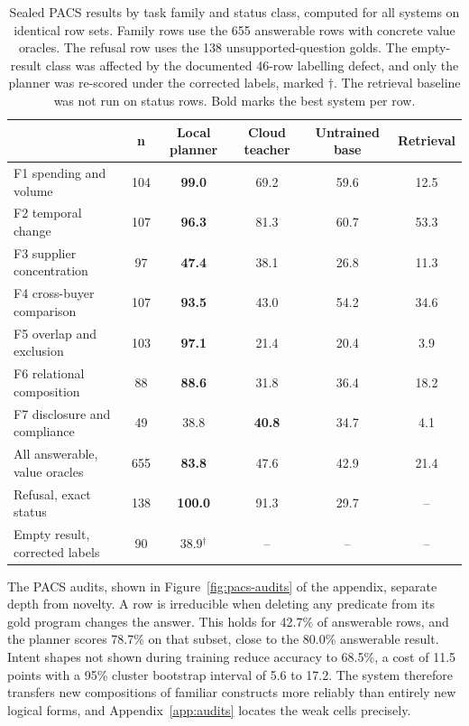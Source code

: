 \documentclass{article}
\begin{document}
\begin{table}[t]
\centering
\caption{Sealed PACS results by task family and status class, computed
for all systems on identical row sets. Family rows use the 655 answerable
rows with concrete value oracles. The refusal row uses the 138
unsupported-question golds. The empty-result class was affected by the
documented 46-row labelling defect, and only the planner was re-scored
under the corrected labels, marked $\dagger$. The retrieval baseline was
not run on status rows. Bold marks the best system per row.}
\label{tab:pacs-family}
\small
\begin{tabular}{lccccc}
\toprule
 & n & Local planner & Cloud teacher & Untrained base & Retrieval \\
\midrule
F1 spending and volume & 104 & \textbf{99.0} & 69.2 & 59.6 & 12.5 \\
F2 temporal change & 107 & \textbf{96.3} & 81.3 & 60.7 & 53.3 \\
F3 supplier concentration & 97 & \textbf{47.4} & 38.1 & 26.8 & 11.3 \\
F4 cross-buyer comparison & 107 & \textbf{93.5} & 43.0 & 54.2 & 34.6 \\
F5 overlap and exclusion & 103 & \textbf{97.1} & 21.4 & 20.4 & 3.9 \\
F6 relational composition & 88 & \textbf{88.6} & 31.8 & 36.4 & 18.2 \\
F7 disclosure and compliance & 49 & 38.8 & \textbf{40.8} & 34.7 & 4.1 \\
\midrule
All answerable, value oracles & 655 & \textbf{83.8} & 47.6 & 42.9 & 21.4 \\
Refusal, exact status & 138 & \textbf{100.0} & 91.3 & 29.7 & -- \\
Empty result, corrected labels & 90 & 38.9$^\dagger$ & -- & -- & -- \\
\bottomrule
\end{tabular}
\end{table}

The PACS audits, shown in Figure~\ref{fig:pacs-audits} of the appendix, separate depth from novelty.
A row is irreducible when deleting any predicate from its gold program changes
the answer. This holds for 42.7\% of answerable rows, and the planner scores
78.7\% on that subset, close to the 80.0\% answerable result. Intent shapes not
shown during training reduce accuracy to 68.5\%, a cost of 11.5 points with
a 95\% cluster bootstrap interval of 5.6 to 17.2. The system therefore transfers
new compositions of familiar constructs more reliably than entirely new
logical forms, and Appendix~\ref{app:audits} locates the weak cells
precisely.
\end{document}
